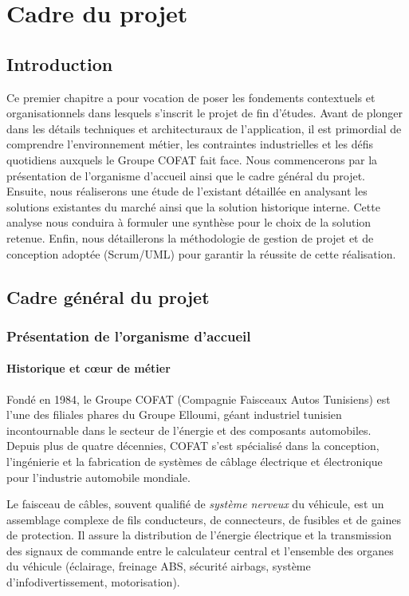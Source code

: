 \chapter{Cadre du projet}
\label{chap:cadre_projet}

\section*{Introduction}

Ce premier chapitre a pour vocation de poser les fondements contextuels et organisationnels dans lesquels s'inscrit le projet de fin d'études. Avant de plonger dans les détails techniques et architecturaux de l'application, il est primordial de comprendre l'environnement métier, les contraintes industrielles et les défis quotidiens auxquels le Groupe COFAT fait face. Nous commencerons par la présentation de l'organisme d'accueil ainsi que le cadre général du projet. Ensuite, nous réaliserons une étude de l'existant détaillée en analysant les solutions existantes du marché ainsi que la solution historique interne. Cette analyse nous conduira à formuler une synthèse pour le choix de la solution retenue. Enfin, nous détaillerons la méthodologie de gestion de projet et de conception adoptée (Scrum/UML) pour garantir la réussite de cette réalisation.

\section{Cadre général du projet}

\subsection{Présentation de l'organisme d'accueil}
\subsubsection{Historique et cœur de métier}
Fondé en 1984, le Groupe COFAT (Compagnie Faisceaux Autos Tunisiens) est l'une des filiales phares du Groupe Elloumi, géant industriel tunisien incontournable dans le secteur de l'énergie et des composants automobiles. Depuis plus de quatre décennies, COFAT s'est spécialisé dans la conception, l'ingénierie et la fabrication de systèmes de câblage électrique et électronique pour l'industrie automobile mondiale. 

Le faisceau de câbles, souvent qualifié de \textit{système nerveux} du véhicule, est un assemblage complexe de fils conducteurs, de connecteurs, de fusibles et de gaines de protection. Il assure la distribution de l'énergie électrique et la transmission des signaux de commande entre le calculateur central et l'ensemble des organes du véhicule (éclairage, freinage ABS, sécurité airbags, système d'infodivertissement, motorisation).

